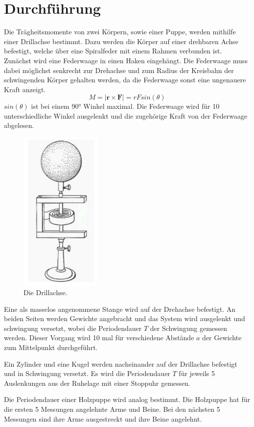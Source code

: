 \section{Durchführung}
\label{sec:Durchführung}
Die Trägheitsmomente von zwei Körpern, sowie einer Puppe, werden mithilfe
einer Drillachse bestimmt. Dazu werden die Körper auf einer drehbaren Achse befestigt,
welche über eine Spiralfeder mit einem Rahmen verbunden ist. Zunächst wird eine Federwaage
in einen Haken eingehängt. Die Federwaage muss dabei möglichst senkrecht zur Drehachse
und zum Radius der Kreisbahn der schwingenden Körper gehalten werden, da
die Federwaage sonst eine ungenauere Kraft anzeigt.
\begin{equation}
  M = |\symbf{r} \times \symbf{F}| = r F sin(\theta)
\end{equation}
$sin(\theta)$ ist bei einem 90° Winkel maximal. Die Federwaage wird für 10 unterschiedliche
Winkel ausgelenkt und die zugehörige Kraft von der Federwaage abgelesen.

\begin{figure}[H]
  \centering
  \includegraphics[height=8cm]{Drillachse.PNG}
  \caption{Die Drillachse.}
  \label{fig:drill}
\end{figure}

Eine als masselos angenommene Stange wird auf der Drehachse befestigt. An beiden
Seiten werden Gewichte angebracht und das System wird ausgelenkt und schwingung
versetzt, wobei die Periodendauer $T$ der Schwingung gemessen werden. Dieser Vorgang
wird 10 mal für verschiedene Abstände $a$ der Gewichte zum Mittelpunkt durchgeführt.

Ein Zylinder und eine Kugel werden nacheinander auf der Drillachse befestigt und
in Schwingung versetzt. Es wird die Periodendauer $T$ für jeweils 5 Auslenkungen
aus der Ruhelage mit einer Stoppuhr gemessen.

Die Periodendauer einer Holzpuppe wird analog bestimmt. Die Holzpuppe
hat für die ersten 5 Messungen angelehnte Arme und Beine. Bei den nächsten 5
Messungen sind ihre Arme ausgestreckt und ihre Beine angelehnt.
